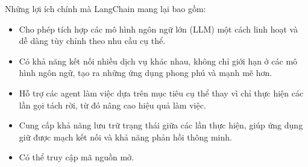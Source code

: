 Những lợi ích chính mà LangChain mang lại bao gồm:
\begin{itemize}
    \item Cho phép tích hợp các mô hình ngôn ngữ lớn (LLM) một cách linh hoạt và dễ dàng tùy chỉnh theo nhu cầu cụ thể.
    \item Có khả năng kết nối nhiều dịch vụ khác nhau, không chỉ giới hạn ở các mô hình ngôn ngữ, tạo ra những ứng dụng phong phú và mạnh mẽ hơn.
    \item Hỗ trợ các agent làm việc dựa trên mục tiêu cụ thể thay vì chỉ thực hiện các lần gọi tách rời, từ đó nâng cao hiệu quả làm việc.
    \item Cung cấp khả năng lưu trữ trạng thái giữa các lần thực hiện, giúp ứng dụng giữ được mạch kết nối và khả năng phản hồi thông minh.
    \item Có thể truy cập mã nguồn mở.
\end{itemize}












